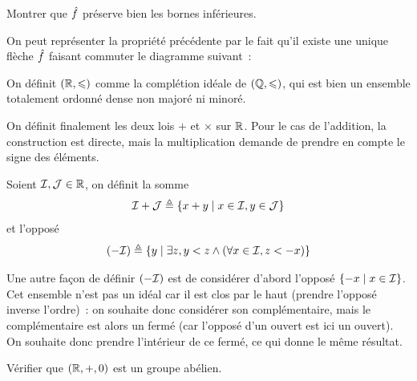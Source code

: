 \begin{exercise}
  Montrer que $\hat{f}$ préserve bien les bornes inférieures.
\end{exercise}

\begin{remark}
  On peut représenter la propriété précédente par le fait qu'il existe une
  unique flèche $\hat{f}$ faisant commuter le diagramme suivant~:
  \begin{center}
  \end{center}
\end{remark}

\begin{definition}
  On définit $(\mathbb R,\leqslant)$ comme la complétion idéale de $(\mathbb Q,\leqslant)$, qui est
  bien un ensemble totalement ordonné dense non majoré ni minoré.
  \index[notation]{$\bR$}
\end{definition}

On définit finalement les deux lois $+$ et $\times$ sur $\bR$. Pour le cas de
l'addition, la construction est directe, mais la multiplication demande de
prendre en compte le signe des éléments.

\begin{definition}
  Soient $\mathcal{I},\mathcal{J}\in\mathbb R$, on définit la somme
  \[\mathcal{I}+\mathcal{J}\triangleq \left\{ x + y \;\middle\vert\; x \in \mathcal{I},y \in \mathcal{J} \right\}\]
  et l'opposé
  \[(-\mathcal{I}) \triangleq
  \left\{ y \;\middle\vert\; \exists z,y < z \land (\forall x \in \mathcal{I}, z < - x) \right\}\]
\end{definition}

\begin{remark}
  Une autre façon de définir $(-\mathcal{I})$ est de considérer d'abord l'opposé
  $\left\{ -x \;\middle\vert\; x \in \mathcal{I} \right\}$. Cet ensemble n'est pas un idéal car il est clos
  par le haut (prendre l'opposé inverse l'ordre)~: on souhaite donc considérer
  son complémentaire, mais le complémentaire est alors un fermé (car l'opposé
  d'un ouvert est ici un ouvert). On souhaite donc prendre l'intérieur de ce
  fermé, ce qui donne le même résultat.
\end{remark}

\begin{exercise}
  Vérifier que $(\mathbb R,+,0)$ est un groupe abélien.
\end{exercise}

